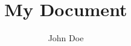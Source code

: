 \documentclass[10pt,a4paper]{article}
\begin{document}
\title{My Document}
\author{John Doe}
\date{}

\maketitle








\end{document}
